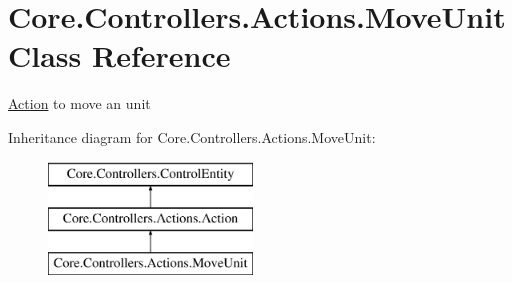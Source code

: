 \hypertarget{classCore_1_1Controllers_1_1Actions_1_1MoveUnit}{}\section{Core.\+Controllers.\+Actions.\+Move\+Unit Class Reference}
\label{classCore_1_1Controllers_1_1Actions_1_1MoveUnit}


\hyperlink{classCore_1_1Controllers_1_1Actions_1_1Action}{Action} to move an unit  


Inheritance diagram for Core.\+Controllers.\+Actions.\+Move\+Unit\+:\begin{figure}[H]
\begin{center}
\leavevmode
\includegraphics[height=3.000000cm]{classCore_1_1Controllers_1_1Actions_1_1MoveUnit}
\end{center}
\end{figure}
